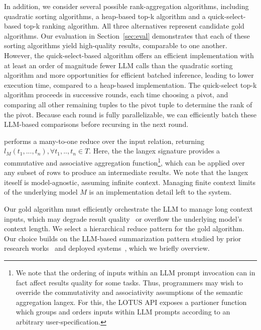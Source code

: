 In addition, we consider several possible rank-aggregation algorithms, including quadratic sorting algorithms, a heap-based top-k algorithm and a quick-select-based top-k ranking algorithm. All three alternatives represent candidate gold algorithms. Our evaluation in Section~\ref{sec:eval} demonstrates that each of these sorting algorithms yield high-quality results, comparable to one another. However, the quick-select-based algorithm offers an efficient implementation with at least an order of magnitude fewer LLM calls than the quadratic sorting algorithm and more opportunities for efficient batched inference, leading to lower execution time, compared to a heap-based implementation. The quick-select top-k algorithm proceeds in successive rounds, each time choosing a pivot, and comparing all other remaining tuples to the pivot tuple to determine the rank of the pivot. Because each round is fully parallelizable, we can efficiently batch these LLM-based comparisons before recursing in the next round. 

 




 performs a many-to-one reduce over the input relation, returning $l_M(t_1, ..., t_n),  \forall t_1, .., t_n \in T$. Here, the the langex signature provides a commutative and associative aggregation function\footnote{We note that the ordering of inputs within an LLM prompt invocation can in fact affect results quality for some tasks. Thus, programmers may wish to override the commutativity and associativity assumptions of the semantic aggregation langex. For this, the LOTUS API exposes a partioner function which groups and orders inputs within LLM prompts according to an arbitrary user-specification.}, which can be applied over any subset of rows to produce an intermediate results. We note that the langex iteself is model-agnostic, assuming infinite context. Managing finite context limits of the underlying model $M$ is an implementation detail left to the system. 


Our gold algorithm must efficiently orchestrate the LLM to manage long context inputs, which may degrade result quality~\cite{liu_lost_2023} or overflow the underlying model's context length. We select a hierarchical reduce pattern for the gold algorithm. Our choice builds on the LLM-based summarization pattern studied by prior research works~\cite{wu_recursively_2021, chang_booookscore_2024, adams_sparse_2023} 
and deployed systems~\cite{llamaindex, langchain}, which we briefly overview. 

